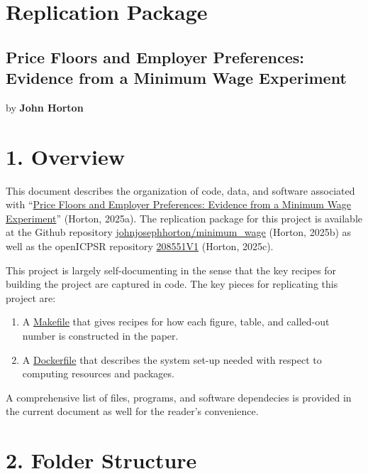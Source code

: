 \documentclass[10pt]{article}
\begin{document}
\section*{Replication Package}
\subsection*{Price Floors and Employer Preferences: Evidence from a Minimum Wage Experiment}
by \textbf{John Horton}

\vspace{1em}
\section*{1. Overview}

This document describes the organization of code, data, and software associated with ``\href{https://www.aeaweb.org/articles?id=10.1257/aer.20170637}{Price Floors and Employer Preferences: Evidence from a Minimum Wage Experiment}'' (Horton, 2025a).
The replication package for this project is available at the Github repository \href{https://www.github.com/johnjosephhorton/minimum\_wage.git}{johnjosephhorton/minimum\_wage} (Horton, 2025b) as well as the openICPSR repository \href{http://doi.org/10.3886/E208551V1}{208551V1} (Horton, 2025c).

This project is largely self-documenting in the sense that the key recipes for building the project are captured in code. 
The key pieces for replicating this project are: 

\begin{enumerate}
    \item A \href{https://www.github.com/johnjosephhorton/minimum\_wage/blob/main/writeup/Makefile}{Makefile} that gives recipes for how each figure, table, and called-out number is constructed in the paper.
    \item A \href{https://www.github.com/johnjosephhorton/minimum\_wage/blob/main/writeup/Dockerfile}{Dockerfile} that describes the system set-up needed with respect to computing resources and packages.
\end{enumerate}

A comprehensive list of files, programs, and software dependecies is provided in the current document as well for the reader's convenience.

\vspace{1em}
\section*{2. Folder Structure}
\end{document}
